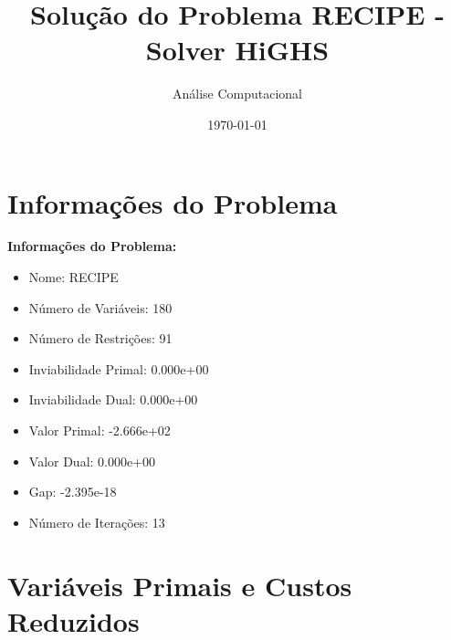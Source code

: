 \documentclass[12pt]{article}
\title{Solução do Problema RECIPE - Solver HiGHS}
\author{Análise Computacional}
\date{\today}
\begin{document}
\maketitle

\section{Informações do Problema}

\textbf{Informações do Problema:}
\begin{itemize}
\item Nome: RECIPE
\item Número de Variáveis: 180
\item Número de Restrições: 91
\item Inviabilidade Primal: 0.000e+00
\item Inviabilidade Dual: 0.000e+00
\item Valor Primal: -2.666e+02
\item Valor Dual: 0.000e+00
\item Gap: -2.395e-18
\item Número de Iterações: 13
\end{itemize}


\section{Variáveis Primais e Custos Reduzidos}
\end{document}

